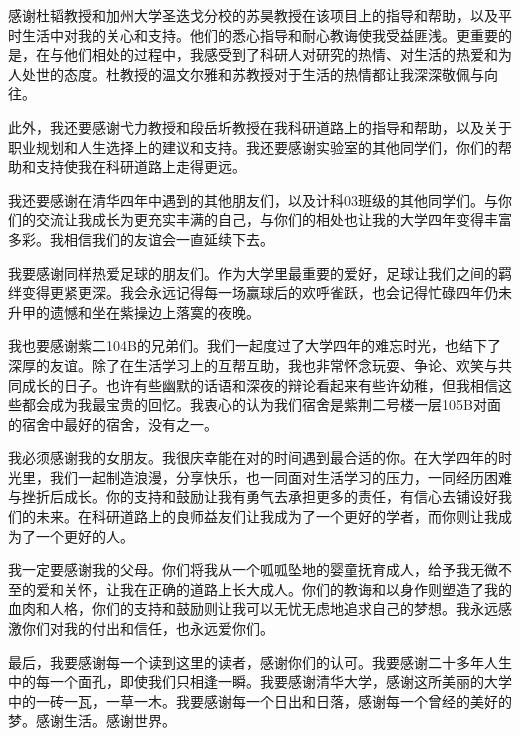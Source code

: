 
\begin{acknowledgements}
  感谢杜韬教授和加州大学圣迭戈分校的苏昊教授在该项目上的指导和帮助，以及平时生活中对我的关心和支持。他们的悉心指导和耐心教诲使我受益匪浅。更重要的是，在与他们相处的过程中，我感受到了科研人对研究的热情、对生活的热爱和为人处世的态度。杜教授的温文尔雅和苏教授对于生活的热情都让我深深敬佩与向往。

  此外，我还要感谢弋力教授和段岳圻教授在我科研道路上的指导和帮助，以及关于职业规划和人生选择上的建议和支持。我还要感谢实验室的其他同学们，你们的帮助和支持使我在科研道路上走得更远。

  我还要感谢在清华四年中遇到的其他朋友们，以及计科03班级的其他同学们。与你们的交流让我成长为更充实丰满的自己，与你们的相处也让我的大学四年变得丰富多彩。我相信我们的友谊会一直延续下去。

  我要感谢同样热爱足球的朋友们。作为大学里最重要的爱好，足球让我们之间的羁绊变得更紧更深。我会永远记得每一场赢球后的欢呼雀跃，也会记得忙碌四年仍未升甲的遗憾和坐在紫操边上落寞的夜晚。

  我也要感谢紫二104B的兄弟们。我们一起度过了大学四年的难忘时光，也结下了深厚的友谊。除了在生活学习上的互帮互助，我也非常怀念玩耍、争论、欢笑与共同成长的日子。也许有些幽默的话语和深夜的辩论看起来有些许幼稚，但我相信这些都会成为我最宝贵的回忆。我衷心的认为我们宿舍是紫荆二号楼一层105B对面的宿舍中最好的宿舍，没有之一。

  我必须感谢我的女朋友。我很庆幸能在对的时间遇到最合适的你。在大学四年的时光里，我们一起制造浪漫，分享快乐，也一同面对生活学习的压力，一同经历困难与挫折后成长。你的支持和鼓励让我有勇气去承担更多的责任，有信心去铺设好我们的未来。在科研道路上的良师益友们让我成为了一个更好的学者，而你则让我成为了一个更好的人。

  我一定要感谢我的父母。你们将我从一个呱呱坠地的婴童抚育成人，给予我无微不至的爱和关怀，让我在正确的道路上长大成人。你们的教诲和以身作则塑造了我的血肉和人格，你们的支持和鼓励则让我可以无忧无虑地追求自己的梦想。我永远感激你们对我的付出和信任，也永远爱你们。

  最后，我要感谢每一个读到这里的读者，感谢你们的认可。我要感谢二十多年人生中的每一个面孔，即使我们只相逢一瞬。我要感谢清华大学，感谢这所美丽的大学中的一砖一瓦，一草一木。我要感谢每一个日出和日落，感谢每一个曾经的美好的梦。感谢生活。感谢世界。

\end{acknowledgements}
